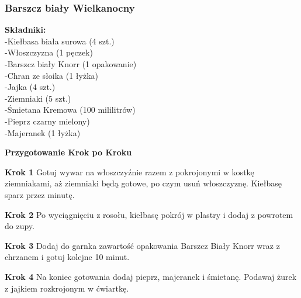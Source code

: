 \documentclass[12pt, letterpaper, titlepage]{article}
\begin{document}
\subsubsection{Barszcz biały Wielkanocny}
\begin{flushleft}
\textbf{Składniki:}\\-Kiełbasa biała surowa (4 szt.)\\-Włoszczyzna (1 pęczek)\\-Barszcz biały Knorr (1 opakowanie)\\-Chran ze słoika (1 łyżka)\\-Jajka (4 szt.)\\-Ziemniaki (5 szt.)\\-Śmietana Kremowa (100 mililitrów)\\-Pieprz czarny mielony)\\-Majeranek (1 łyżka)\\
\end{flushleft}
\begin{center}
\textbf{Przygotowanie Krok po Kroku}
\end{center}
\begin{flushleft}
\textbf{Krok 1}
Gotuj wywar na włoszczyźnie razem z pokrojonymi w kostkę ziemniakami, aż ziemniaki będą gotowe, po czym usuń włoszczyznę. Kiełbasę sparz przez minutę.
\end{flushleft}
\begin{flushleft}
\textbf{Krok 2}
Po wyciągnięciu z rosołu, kiełbasę pokrój w plastry i dodaj z powrotem do zupy.
\end{flushleft}
\begin{flushleft}
\textbf{Krok 3}
Dodaj do garnka zawartość opakowania Barszcz Biały Knorr wraz z chrzanem i gotuj kolejne 10 minut.
\end{flushleft}
\begin{flushleft}
\textbf{Krok 4}
Na koniec gotowania dodaj pieprz, majeranek i śmietanę. Podawaj żurek z jajkiem rozkrojonym w ćwiartkę.
\end{flushleft}
\newpage
\end{document}

